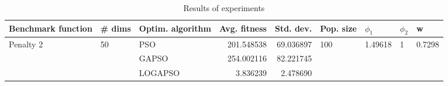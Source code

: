 \begin{table}
\centering
\caption{Results of experiments}
\begin{tabular}{lllrrllll}
\toprule
        Benchmark function &             \# dims & Optim. algorithm &  Avg. fitness &  Std. dev. &            Pop. size &               $\phi_{1}$ &         $\phi_{2}$ &                       w \\
\midrule
\multirow{3}{*}{Penalty 2} & \multirow{3}{*}{50} &              PSO &    201.548538 &  69.036897 & \multirow{3}{*}{100} & \multirow{3}{*}{1.49618} & \multirow{3}{*}{1} & \multirow{3}{*}{0.7298} \\
                           &                     &            GAPSO &    254.002116 &  82.221745 &                      &                          &                    &                         \\
                           &                     &          LOGAPSO &      3.836239 &   2.478690 &                      &                          &                    &                         \\
\bottomrule
\end{tabular}
\end{table}
